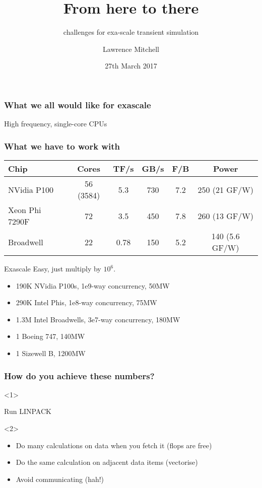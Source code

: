 \documentclass[presentation]{beamer}
\date{27th March 2017}
\author{Lawrence Mitchell\inst{1}}
\institute{
\inst{1}Departments of Computing and Mathematics, Imperial College
London
}
\title{From here to there}
\subtitle{challenges for \cancel{peta} exa-scale transient simulation}
\begin{document}
\maketitle

\begin{frame}
  \frametitle{What we all would like for exascale}
  \begin{center}
    \Large High frequency, single-core CPUs
  \end{center}
\end{frame}

\begin{frame}
  \frametitle{What we have to work with}
  \begin{tabular}{lccccc}
    Chip & Cores & TF/s & GB/s & F/B & Power \\
    \hline
    NVidia P100 & 56 (3584) & 5.3 & 730 & 7.2 & 250 (21 GF/W) \\
    Xeon Phi 7290F & 72 & 3.5 & 450 & 7.8 & 260 (13 GF/W) \\
    Broadwell & 22 & 0.78 & 150 & 5.2 & 140 (5.6 GF/W)
  \end{tabular}

  \begin{block}{Exascale}
    Easy, just multiply by $10^6$.
    \begin{itemize}
    \item<1-> 190K NVidia P100s, 1e9-way concurrency, 50MW
    \item<1-> 290K Intel Phis, 1e8-way concurrency, 75MW
    \item<1-> 1.3M Intel Broadwells, 3e7-way concurrency, 180MW
    \item<2-> 1 Boeing 747, 140MW
    \item<3-> 1 Sizewell B, 1200MW
    \end{itemize}
  \end{block}


\end{frame}
\begin{frame}
  \frametitle{How do you achieve these numbers?}

  \begin{onlyenv}<1>
    \begin{center}
      \Large
      Run LINPACK
  \end{center}
  \end{onlyenv}

  \begin{onlyenv}<2>
    \begin{itemize}
    \item Do many calculations on data when you fetch it (flops are free)
    \item Do the same calculation on adjacent data items (vectorise)
    \item Avoid communicating (hah!)
    \end{itemize}
  \end{onlyenv}
\end{frame}
\end{document}
